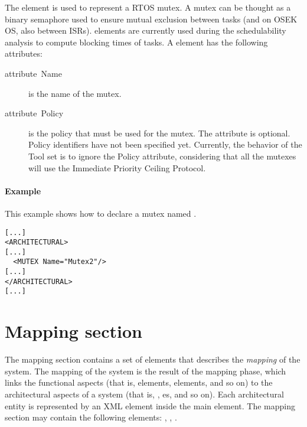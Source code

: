 The  element is used to represent a RTOS mutex. A mutex
can be thought as a binary semaphore used to ensure mutual exclusion
between tasks (and on OSEK OS, also between ISRs). 
elements are currently used during the schedulability analysis to
compute blocking times of tasks. A  element has the
following attributes:

\begin{description}
\item [{attribute~Name}] is the name of the mutex.
\item [{attribute~Policy}] is the policy that must be used for the
  mutex.  The attribute is optional. Policy identifiers have not been
  specified yet. Currently, the behavior of the Tool set is to ignore
  the Policy attribute, considering that all the mutexes will use the
  Immediate Priority Ceiling Protocol.
\end{description}

\paragraph{Example}

This example shows how to declare a mutex named .

\begin{lstlisting}
[...]
<ARCHITECTURAL>
[...]
  <MUTEX Name="Mutex2"/>
[...]
</ARCHITECTURAL>
[...]
\end{lstlisting}


\section{Mapping section}
\label{sec:Mapping-section}

The mapping section contains a set of elements that describes the
\emph{mapping} of the system. The mapping of the system is the result
of the mapping phase, which links the functional aspects (that is,
 elements,  elements, and so on) to the
architectural aspects of a system (that is, ,
es, and so on). Each architectural entity is represented
by an XML element inside the main  element. The mapping
section may contain the following elements: ,
, .


\subsection{}

